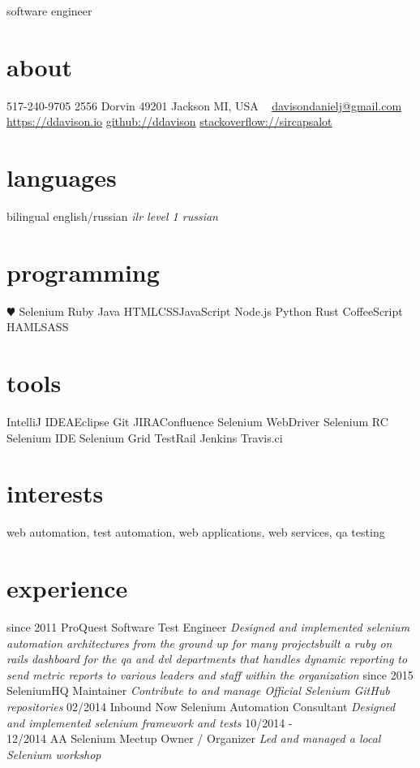 \documentclass[]{ddavison-resume}
\begin{document}
       {software engineer}


\begin{aside}
  \section{about}
  	517-240-9705
    2556 Dorvin
    49201 Jackson
    MI, USA
    ~
    \href{mailto:davisondanielj@gmail.com}{davisondanielj@gmail.com}
    \href{https://ddavison.io}{https://ddavison.io}
    \href{https://github.com/ddavison}{github://ddavison}
    \href{https://stackoverflow.com/users/1695163/sircapsalot}{stackoverflow://sircapsalot}
  \section{languages}
    bilingual english/russian
	\emph{ilr level 1 russian}
  \section{programming}
    {\color{red} $\varheartsuit$} Selenium
    Ruby
    Java
    HTML\bullet CSS\bullet JavaScript
    Node.js
    Python
    Rust
    CoffeeScript
    HAML\bullet SASS
  \section{tools}
	IntelliJ IDEA\bullet Eclipse  	
	Git  	
  	JIRA\bullet Confluence
  	Selenium WebDriver
  	Selenium RC
  	Selenium IDE
  	Selenium Grid
  	TestRail
  	Jenkins
  	Travis.ci
\end{aside}

\section{interests}

web automation, test automation, web applications, web services, qa testing

\section{experience}

\begin{entrylist}
  \entry
  	{since 2011}
  	{ProQuest}
  	{Software Test Engineer}
  	{\emph{Designed and implemented selenium automation architectures from the ground up for many projects\bullet built a ruby on rails dashboard for the qa and dvl departments that handles dynamic reporting to send metric reports to various leaders and staff within the organization}} 
  \entry
  	{since 2015}
  	{SeleniumHQ}
  	{Maintainer}
  	{\emph{Contribute to and manage Official Selenium GitHub repositories}}
  \entry
  	{02/2014}
  	{Inbound Now}
  	{Selenium Automation Consultant}
  	{\emph{Designed and implemented selenium framework and tests}}
  \entry
  	{10/2014 - \\
  	12/2014}
  	{AA Selenium Meetup}
  	{Owner / Organizer}
  	{\emph{Led and managed a local Selenium workshop}}
\end{entrylist}
\end{document}
